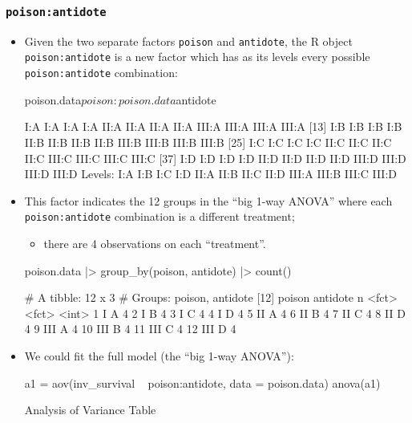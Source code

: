 \documentclass[a4paper]{article}\usepackage[]{graphicx}\usepackage[]{xcolor}
\begin{document}
\subsubsection{\textcolor{myblue}{\lstinline|poison:antidote|}}
\begin{itemize}
	\item Given the two separate factors \lstinline|poison| and \lstinline|antidote|, the R object \lstinline|poison:antidote| is a new factor which has as its levels every possible \lstinline|poison:antidote| combination:
\begin{Schunk}
\begin{Sinput}
poison.data$poison:poison.data$antidote
\end{Sinput}
\begin{Soutput}
 [1] I:A   I:A   I:A   I:A   II:A  II:A  II:A  II:A  III:A III:A III:A III:A
[13] I:B   I:B   I:B   I:B   II:B  II:B  II:B  II:B  III:B III:B III:B III:B
[25] I:C   I:C   I:C   I:C   II:C  II:C  II:C  II:C  III:C III:C III:C III:C
[37] I:D   I:D   I:D   I:D   II:D  II:D  II:D  II:D  III:D III:D III:D III:D
Levels: I:A I:B I:C I:D II:A II:B II:C II:D III:A III:B III:C III:D
\end{Soutput}
\end{Schunk}
	\item This factor indicates the 12 groups in the ``big 1-way ANOVA'' where each \lstinline|poison:antidote| combination is a different treatment;
	\begin{itemize}
		\item there are 4 observations on each ``treatment''.
	\end{itemize}
\begin{Schunk}
\begin{Sinput}
poison.data |> 
  group_by(poison, antidote) |> 
  count()
\end{Sinput}
\begin{Soutput}
# A tibble: 12 x 3
# Groups:   poison, antidote [12]
   poison antidote     n
   <fct>  <fct>    <int>
 1 I      A            4
 2 I      B            4
 3 I      C            4
 4 I      D            4
 5 II     A            4
 6 II     B            4
 7 II     C            4
 8 II     D            4
 9 III    A            4
10 III    B            4
11 III    C            4
12 III    D            4
\end{Soutput}
\end{Schunk}
	\item We could fit the full model (the ``big 1-way ANOVA''):
\begin{Schunk}
\begin{Sinput}
a1 = aov(inv_survival ~ poison:antidote, data = poison.data)
anova(a1)
\end{Sinput}
\begin{Soutput}
Analysis of Variance Table


\end{Soutput}
\end{Schunk}
\end{itemize}
\end{document}
